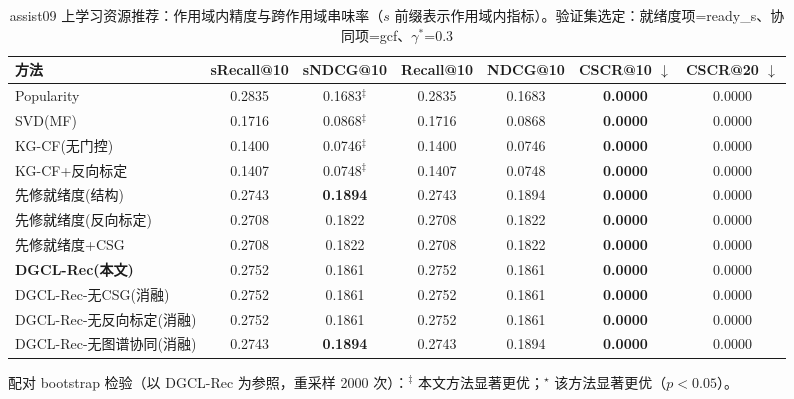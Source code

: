 \begin{table}[htbp]
\centering
\caption{assist09 上学习资源推荐：作用域内精度与跨作用域串味率（$s$ 前缀表示作用域内指标）。验证集选定：就绪度项=ready_s、协同项=gcf、$\gamma^\ast$=0.3}
\label{tab:rec_assist09}
\begin{tabular}{lcccccc}
\toprule
方法 & sRecall@10 & sNDCG@10 & Recall@10 & NDCG@10 & CSCR@10 $\downarrow$ & CSCR@20 $\downarrow$ \\
\midrule
Popularity & 0.2835 & 0.1683$^{\ddagger}$ & 0.2835 & 0.1683 & \textbf{0.0000} & 0.0000 \\
SVD(MF) & 0.1716 & 0.0868$^{\ddagger}$ & 0.1716 & 0.0868 & \textbf{0.0000} & 0.0000 \\
KG-CF(无门控) & 0.1400 & 0.0746$^{\ddagger}$ & 0.1400 & 0.0746 & \textbf{0.0000} & 0.0000 \\
KG-CF+反向标定 & 0.1407 & 0.0748$^{\ddagger}$ & 0.1407 & 0.0748 & \textbf{0.0000} & 0.0000 \\
先修就绪度(结构) & 0.2743 & \textbf{0.1894} & 0.2743 & 0.1894 & \textbf{0.0000} & 0.0000 \\
先修就绪度(反向标定) & 0.2708 & 0.1822 & 0.2708 & 0.1822 & \textbf{0.0000} & 0.0000 \\
先修就绪度+CSG & 0.2708 & 0.1822 & 0.2708 & 0.1822 & \textbf{0.0000} & 0.0000 \\
\textbf{DGCL-Rec(本文)} & 0.2752 & 0.1861 & 0.2752 & 0.1861 & \textbf{0.0000} & 0.0000 \\
DGCL-Rec-无CSG(消融) & 0.2752 & 0.1861 & 0.2752 & 0.1861 & \textbf{0.0000} & 0.0000 \\
DGCL-Rec-无反向标定(消融) & 0.2752 & 0.1861 & 0.2752 & 0.1861 & \textbf{0.0000} & 0.0000 \\
DGCL-Rec-无图谱协同(消融) & 0.2743 & \textbf{0.1894} & 0.2743 & 0.1894 & \textbf{0.0000} & 0.0000 \\
\bottomrule
\end{tabular}
\par\smallskip\footnotesize 配对 bootstrap 检验（以 DGCL-Rec 为参照，重采样 2000 次）：$^{\ddagger}$ 本文方法显著更优；$^{\star}$ 该方法显著更优（$p<0.05$）。
\end{table}